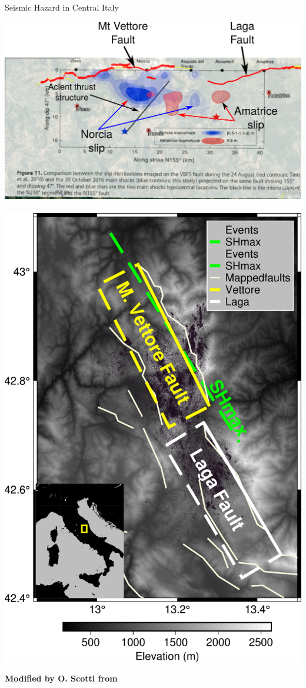 \documentclass{beamer}
\begin{document}
\begin{frame}
 {Seismic Hazard in Central Italy}
 
 \begin{center}
  \includegraphics[width=0.65\linewidth]{images/amatrice_4.pdf} \,
  \includegraphics[width=0.3\linewidth]{images/map_italy.png}  
 \end{center}

  \vskip 0.2cm
  {\bf \hfill \scriptsize Modified by O. Scotti from \cite{Scognamiglio_2018_CFG}}
  \addtocounter{framenumber}{-1}
  
\end{frame}
\end{document}
